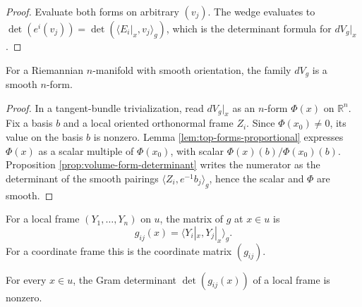 \begin{proof}

\sketch Evaluate both forms on arbitrary $(v_j)$. The wedge evaluates to $\det(e^i(v_j))=\det(\langle E_i|_x,v_j\rangle_g)$, which is the determinant formula for $dV_g|_x$.
\end{proof}

\begin{proposition}
\label{prop:volume-form-smooth}





For a Riemannian $n$-manifold with smooth orientation, the family $dV_g$ is a smooth $n$-form.
\end{proposition}

\begin{proof}

\sketch In a tangent-bundle trivialization, read $dV_g|_x$ as an $n$-form $\Phi(x)$ on $\mathbb R^n$. Fix a basis $b$ and a local oriented orthonormal frame $Z_i$. Since $\Phi(x_0)\ne0$, its value on the basis $b$ is nonzero. Lemma \ref{lem:top-forms-proportional} expresses $\Phi(x)$ as a scalar multiple of $\Phi(x_0)$, with scalar $\Phi(x)(b)/\Phi(x_0)(b)$. Proposition \ref{prop:volume-form-determinant} writes the numerator as the determinant of the smooth pairings $\langle Z_i,e^{-1}b_j\rangle_g$, hence the scalar and $\Phi$ are smooth.
\end{proof}

\begin{definition}
\label{def:frame-matrix}




For a local frame $(Y_1,\ldots,Y_n)$ on $u$, the matrix of $g$ at $x\in u$ is
\[
g_{ij}(x)=\langle Y_i|_x,Y_j|_x\rangle_g.
\]
For a coordinate frame this is the coordinate matrix $(g_{ij})$.
\end{definition}

\begin{lemma}
\label{lem:frame-matrix-nonsingular}





For every $x\in u$, the Gram determinant $\det(g_{ij}(x))$ of a local frame is nonzero.
\end{lemma}


